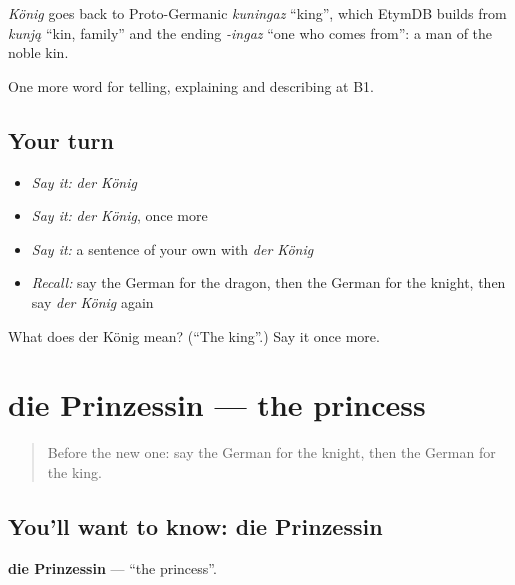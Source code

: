 \begin{cousinweb}
\emph{König} goes back to Proto-Germanic \emph{kuningaz} \textquotedblleft{}king\textquotedblright{}, which EtymDB builds from \emph{kunją} \textquotedblleft{}kin, family\textquotedblright{} and the ending \emph{-ingaz} \textquotedblleft{}one who comes from\textquotedblright{}: a man of the noble kin.
\end{cousinweb}

\begin{grammarlens}[title={What you've built}]
One more word for telling, explaining and describing at B1.
\end{grammarlens}

\subsection*{Your turn}
\begin{itemize}
\raggedright
  \item \emph{Say it:} \emph{der König}
  \item \emph{Say it:} \emph{der König}, once more
  \item \emph{Say it:} a sentence of your own with \emph{der König}
  \item \emph{Recall:} say the German for the dragon, then the German for the knight, then say \emph{der König} again
\end{itemize}

\begin{tcolorbox}[breakable,colback=teal!4,colframe=teal!35!black,title={Before you move on}]
What does der König mean? (\textquotedblleft{}The king\textquotedblright{}.) Say it once more.
\end{tcolorbox}
\section[die Prinzessin]{die Prinzessin — the princess}

\label{lesson:GE-C315-prinzessin}



\begin{quote}
Before the new one: say the German for the knight, then the German for the king.
\end{quote}

\subsection*{You'll want to know: die Prinzessin}
\textbf{die Prinzessin} — \textquotedblleft{}the princess\textquotedblright{}.

